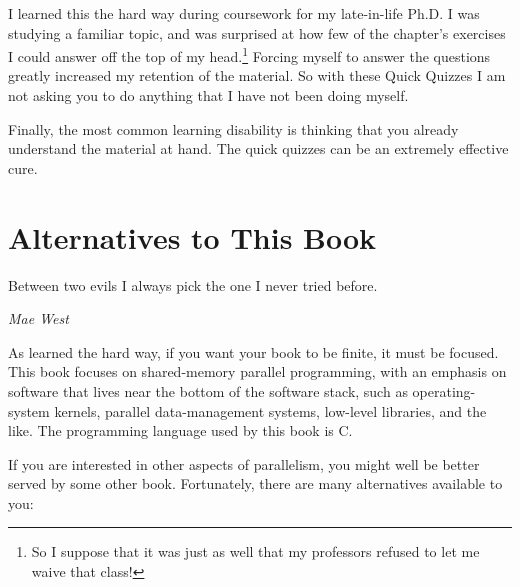 I learned this the hard way during coursework for my late-in-life
Ph.D\@.
I was studying a familiar topic, and was surprised at how few of
the chapter's exercises I could answer off the top of my head.\footnote{
	So I suppose that it was just as well that my professors refused
	to let me waive that class!}
Forcing myself to answer the questions greatly increased my
retention of the material.
So with these Quick Quizzes I am not asking you to do anything
that I have not been doing myself.

Finally, the most common learning disability is thinking that
you already understand the material at hand.
The quick quizzes can be an extremely effective cure.

\section{Alternatives to This Book}
\label{sec:Alternatives to This Book}
%
\epigraph{Between two evils I always pick the one I never tried before.}
	 {\emph{Mae West}}

As  learned the hard way, if you want your book
to be finite, it must be focused.
This book focuses on shared-memory parallel programming, with an
emphasis on software that lives near the bottom of the software stack,
such as operating-system kernels, parallel data-management systems,
low-level libraries, and the like.
The programming language used by this book is C.

If you are interested in other aspects of parallelism, you might well
be better served by some other book.
Fortunately, there are many alternatives available to you:

